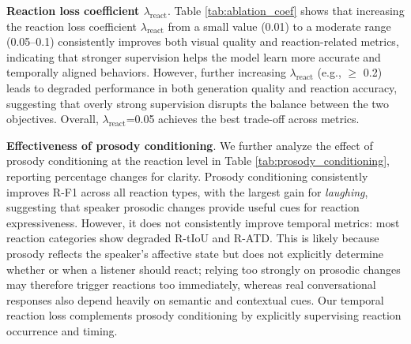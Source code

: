 \textbf{Reaction loss coefficient $\lambda_{\text{react}}$}. Table \ref{tab:ablation_coef} shows that increasing the reaction loss coefficient $\lambda_{\text{react}}$ from a small value (0.01) to a moderate range (0.05--0.1) consistently improves both visual quality and reaction-related metrics, indicating that stronger supervision helps the model learn more accurate and temporally aligned behaviors. However, further increasing $\lambda_{\text{react}}$ (e.g., $\geq$ 0.2) leads to degraded performance in both generation quality and reaction accuracy, suggesting that overly strong supervision disrupts the balance between the two objectives. Overall, $\lambda_{\text{react}}$=0.05 achieves the best trade-off across metrics.

\textbf{Effectiveness of prosody conditioning}. We further analyze the effect of prosody conditioning at the reaction level in Table \ref{tab:prosody_conditioning}, reporting percentage changes for clarity. Prosody conditioning consistently improves R-F1 across all reaction types, with the largest gain for \textit{laughing}, suggesting that speaker prosodic changes provide useful cues for reaction expressiveness. However, it does not consistently improve temporal metrics: most reaction categories show degraded R-tIoU and R-ATD. This is likely because prosody reflects the speaker's affective state but does not explicitly determine whether or when a listener should react; relying too strongly on prosodic changes may therefore trigger reactions too immediately, whereas real conversational responses also depend heavily on semantic and contextual cues. Our temporal reaction loss complements prosody conditioning by explicitly supervising reaction occurrence and timing.




